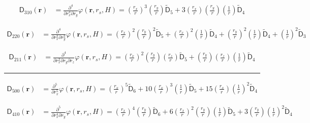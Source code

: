 \begin{align}
  \mathsf{D}_{310}(\mathbf{r}) &= \frac{\partial^4}{\partial r_x^3
    \partial r_y} \varphi (\mathbf{r}, r_s, H) =
  \left(\frac{r_x}{r}\right)^3 \left(\frac{r_y}{r}\right) \mathsf{\tilde{D}}_{5} +
  3 \left(\frac{r_x}{r}\right) \left(\frac{r_y}{r}\right) \left(\frac{1}{r}\right) \mathsf{\tilde{D}}_{4}
  \nonumber
\end{align}

\begin{align}
  \mathsf{D}_{220}(\mathbf{r}) &= \frac{\partial^4}{\partial r_x^2
    \partial r_y^2} \varphi (\mathbf{r}, r_s, H) =
    \left(\frac{r_x}{r}\right)^2 \left(\frac{r_y}{r}\right)^2 \mathsf{\tilde{D}}_{5} +
    \left(\frac{r_x}{r}\right)^2 \left(\frac{1}{r}\right) \mathsf{\tilde{D}}_{4} +
    \left(\frac{r_y}{r}\right)^2 \left(\frac{1}{r}\right) \mathsf{\tilde{D}}_{4} +
    \left(\frac{1}{r}\right)^2 \mathsf{\tilde{D}}_{3}
  \nonumber
\end{align}

\begin{align}
  \mathsf{D}_{211}(\mathbf{r}) &= \frac{\partial^4}{\partial r_x^2
    \partial r_y   \partial r_z} \varphi (\mathbf{r}, r_s, H) =
    \left(\frac{r_x}{r}\right)^2\left(\frac{r_y}{r}\right)\left(\frac{r_z}{r}\right) \mathsf{\tilde{D}}_{5} +
    \left(\frac{r_y}{r}\right)\left(\frac{r_z}{r}\right)\left(\frac{1}{r}\right) \mathsf{\tilde{D}}_{4}
  \nonumber
\end{align}

\noindent\rule{6cm}{0.4pt}
\begin{align}
  \mathsf{D}_{500}(\mathbf{r}) &= \frac{\partial^5}{\partial r_x^5}
  \varphi (\mathbf{r}, r_s, H) =
  \left(\frac{r_x}{r}\right)^5 \mathsf{\tilde{D}}_{6} +
  10\left(\frac{r_x}{r}\right)^3\left(\frac{1}{r}\right)\mathsf{\tilde{D}}_{5} +
  15\left(\frac{r_x}{r}\right)\left(\frac{1}{r}\right)^2\mathsf{\tilde{D}}_{4}
  \nonumber
\end{align}

\begin{align}
  \mathsf{D}_{410}(\mathbf{r}) &= \frac{\partial^5}{\partial r_x^4
    \partial r_y} \varphi (\mathbf{r}, r_s, H) =
  \left(\frac{r_x}{r}\right)^4 \left(\frac{r_y}{r}\right) \mathsf{\tilde{D}}_{6} +
  6 \left(\frac{r_x}{r}\right)^2 \left(\frac{r_y}{r}\right)\left(\frac{1}{r}\right) \mathsf{\tilde{D}}_{5} + 
  3 \left(\frac{r_y}{r}\right) \left(\frac{1}{r}\right)^2\mathsf{\tilde{D}}_{4}
  \nonumber
\end{align}

